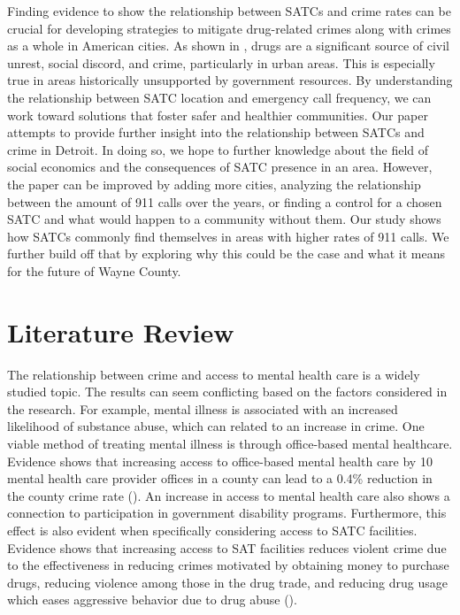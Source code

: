 \documentclass[12pt]{article}
\begin{document}
Finding evidence to show the relationship between SATCs and crime rates can be crucial for developing strategies to mitigate drug-related crimes along with crimes as a whole in American cities. As shown in \cite{SAT_centers_and_crime}, drugs are a significant source of civil unrest, social discord, and crime, particularly in urban areas. This is especially true in areas historically unsupported by government resources. By understanding the relationship between SATC location and emergency call frequency, we can work toward solutions that foster safer and healthier communities. Our paper attempts to provide further insight into the relationship between SATCs and crime in Detroit. In doing so, we hope to further knowledge about the field of social economics and the consequences of SATC presence in an area. However, the paper can be improved by adding more cities, analyzing the relationship between the amount of 911 calls over the years, or finding a control for a chosen SATC and what would happen to a community without them. Our study shows how SATCs commonly find themselves in areas with higher rates of 911 calls. We further build off that by exploring why this could be the case and what it means for the future of Wayne County.



\section{Literature Review} \label{sec:literature}
The relationship between crime and access to mental health care is a widely studied topic. The results can seem conflicting based on the factors considered in the research.  For example, mental illness is associated with an increased likelihood of substance abuse, which can related to an increase in crime. One viable method of treating mental illness is through office-based mental healthcare. Evidence shows that increasing access to office-based mental health care by 10 mental health care provider offices in a county can lead to a 0.4\% reduction in the county crime rate (\cite{mental_healthcare_and_crime}). An increase in access to mental health care also shows a connection to participation in government disability programs. Furthermore, this effect is also evident when specifically considering access to SATC facilities. Evidence shows that increasing access to SAT facilities reduces violent crime due to the effectiveness in reducing crimes motivated by obtaining money to purchase drugs, reducing violence among those in the drug trade, and reducing drug usage which eases aggressive behavior due to drug abuse (\cite{SAT_centers_and_crime}). 
\end{document}
